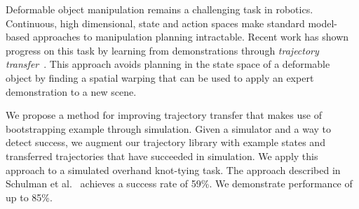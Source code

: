 Deformable object manipulation remains a challenging task in robotics.
Continuous, high dimensional, state and action spaces make standard
model-based approaches to manipulation planning intractable. Recent work
has shown progress on this task by learning from
demonstrations through 
\emph{trajectory transfer}~\cite{Schulmanetal_ISRR2013, Schulmanetal_IROS2013}. This 
approach avoids planning in the state space of a deformable object
by finding a spatial warping that can be used to apply an expert demonstration
to a new scene.

We propose a method for improving trajectory transfer that makes use of bootstrapping
example through simulation. Given a simulator and a way to detect success, we augment
our trajectory library with example states and transferred trajectories that have succeeded
in simulation. We apply this approach to a simulated overhand knot-tying task. The
approach described in Schulman et al.~\cite{Schulmanetal_ISRR2013} achieves a success rate
of 59\%. We demonstrate performance of up to 85\%. 
